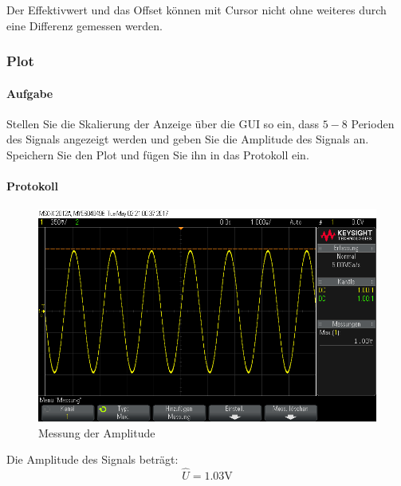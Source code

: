 \documentclass[10pt]{scrreprt}
\begin{document}
        \vspace{0.5cm}

         Der Effektivwert und das Offset können mit Cursor nicht ohne weiteres
         durch eine Differenz gemessen werden.

        \subsubsection{Plot}
        \paragraph{Aufgabe}
        Stellen Sie die Skalierung der Anzeige über die GUI so ein, dass $5 - 8$ Perioden des
        Signals angezeigt werden und geben Sie die Amplitude des Signals an. Speichern
        Sie den Plot und fügen Sie ihn in das Protokoll ein.
        \paragraph{Protokoll}
        \begin{center}
            \begin{figure}[H]
                \includegraphics[width=\textwidth]{Screenshot_4113.png}
              \caption{Messung der Amplitude}
            \end{figure}
        \end{center}
        Die Amplitude des Signals beträgt:
        \begin{equation*}
            \hat{U} = 1.03\si{\volt}
        \end{equation*}
\end{document}
